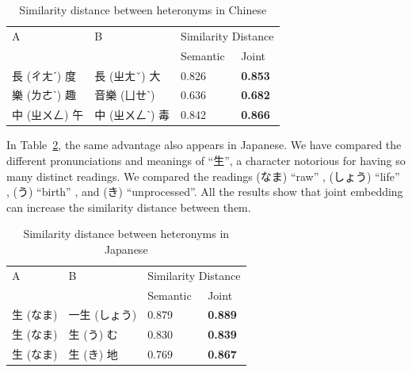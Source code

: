 \vspace{0.1cm}
\begin{table}[h]
    \centering
        \begin{tabularx}{\textwidth}{bbbb}
            \toprule
            \multirow{2.5}{*}{A} & \multirow{2.5}{*}{B} & \multicolumn{2}{c}{Similarity Distance} \\
            \cmidrule(lr){3-4} {} & {} & Semantic & Joint \\\midrule
            長 (ㄔㄤˊ) 度 & 長 (ㄓㄤˇ) 大 & 0.826 & \textbf{0.853} \\
            樂 (ㄌㄜˋ) 趣 & 音樂 (ㄩㄝˋ) & 0.636 & \textbf{0.682} \\
            中 (ㄓㄨㄥ) 午 & 中 (ㄓㄨㄥˋ) 毒 & 0.842 & \textbf{0.866} \\\bottomrule
        \end{tabularx}
    \caption{Similarity distance between heteronyms in Chinese}
    \label{tab:analysis_heteronym1}
\end{table}

\begin{CJK}{UTF8}{ipxm}
    In Table~\ref{tab:analysis_heteronym2}, the same advantage also appears in Japanese. We have compared the different pronunciations and meanings of ``生'', a character notorious for having so many distinct readings.  We compared the readings (なま) ``raw'' , (しょう) ``life'' , (う) ``birth'' , and (き) ``unprocessed''. All the results show that joint embedding can increase the similarity distance between them.
\end{CJK}

\vspace{0.1cm}    
\begin{table}[h]
    \centering
    \begin{CJK}{UTF8}{ipxm}
        \begin{tabularx}{\textwidth}{bbbb}
            \toprule
            \multirow{2.5}{*}{A} & \multirow{2.5}{*}{B} & \multicolumn{2}{c}{Similarity Distance} \\
            \cmidrule(lr){3-4} {} & {} & Semantic & Joint \\\midrule
            生 (なま) & 一生 (しょう) & 0.879 & \textbf{0.889} \\
            生 (なま) & 生 (う) む & 0.830 & \textbf{0.839} \\
            生 (なま) & 生 (き) 地 & 0.769 & \textbf{0.867} \\\bottomrule
        \end{tabularx}
    \end{CJK}
    \caption{Similarity distance between heteronyms in Japanese}
    \label{tab:analysis_heteronym2}
\end{table}

